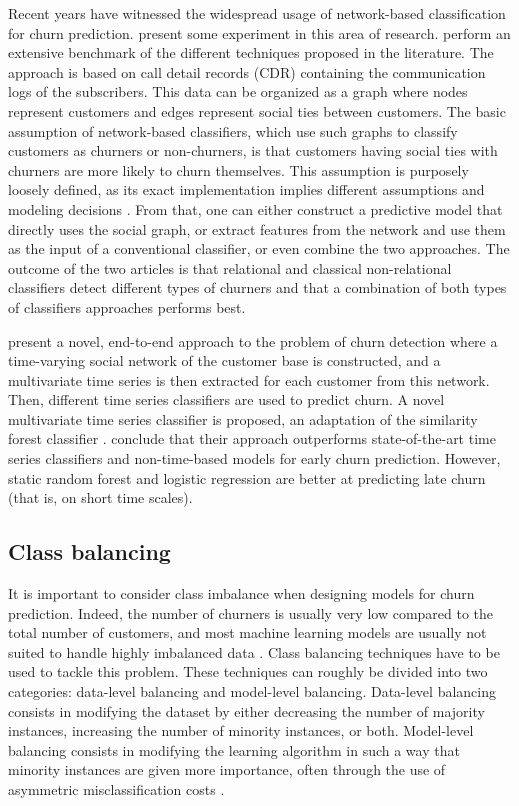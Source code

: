Recent years have witnessed the widespread usage of network-based classification
for churn prediction. \textcite{verbeke2014social} present some experiment in
this area of research. \parencite{oskarsdottir2017social} perform an extensive
benchmark of the different techniques proposed in the literature. The approach
is based on call detail records (CDR) containing the communication logs of the
subscribers. This data can be organized as a graph where nodes represent
customers and edges represent social ties between customers. The basic
assumption of network-based classifiers, which use such graphs to classify
customers as churners or non-churners, is that customers having social ties with
churners are more likely to churn themselves. This assumption is purposely
loosely defined, as its exact implementation implies different assumptions and
modeling decisions \parencite{oskarsdottir2017social}. From that, one can either
construct a predictive model that directly uses the social graph, or extract
features from the network and use them as the input of a conventional
classifier, or even combine the two approaches. The outcome of the two articles
is that relational and classical non-relational classifiers detect different
types of churners and that a combination of both types of classifiers
approaches performs best.

\textcite{oskarsdottir2018time} present a novel, end-to-end approach to the
problem of churn detection where a time-varying social network of the customer
base is constructed, and a multivariate time series is then extracted for each
customer from this network. Then, different time series classifiers are used to
predict churn. A novel multivariate time series classifier is proposed, an
adaptation of the similarity forest classifier \parencite{sathe2017similarity}.
\textcite{oskarsdottir2018time} conclude that their approach outperforms
state-of-the-art time series classifiers and non-time-based models for early
churn prediction. However, static random forest and logistic regression are
better at predicting late churn (that is, on short time scales).

\subsection{Class balancing}

It is important to consider class imbalance when designing models for churn
prediction. Indeed, the number of churners is usually very low compared to the
total number of customers, and most machine learning models are usually not
suited to handle highly imbalanced data \parencite{batista2004study}. Class
balancing techniques have to be used to tackle this problem. These techniques
can roughly be divided into two categories: data-level balancing and model-level
balancing. Data-level balancing consists in modifying the dataset by either
decreasing the number of majority instances, increasing the number of minority
instances, or both. Model-level balancing consists in modifying the learning
algorithm in such a way that minority instances are given more importance, often
through the use of asymmetric misclassification costs
\parencite{zhu2017empirical}.


